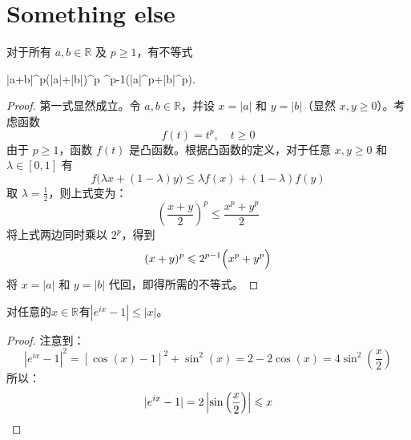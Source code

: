 \section{Something else}

\begin{theorem}
	对于所有 $a,b\in\mathbb{R}$ 及 $p\ge 1$，有不等式
	\begin{inequality*}\label{ineq:else-1}
		|a+b|^p\leqslant\Bigl(|a|+|b|\Bigr)^p ^{p-1}\Bigl(|a|^p+|b|^p\Bigr).
	\end{inequality*}
\end{theorem}
\begin{proof}
	第一式显然成立。令 $a,b\in\mathbb{R}$，并设 $x=|a|$ 和 $y=|b|$（显然 $x,y\geqslant0$）。考虑函数
	\begin{equation*}
		f(t)=t^p,\quad t\ge 0
	\end{equation*}
	由于 $p\geqslant1$，函数 $f(t)$ 是凸函数。根据凸函数的定义，对于任意 $x,y\ge 0$ 和 $\lambda\in[0,1]$ 有
	\begin{equation*}
		f\bigl(\lambda x+(1-\lambda)y\bigr)\leqslant\lambda f(x)+(1-\lambda)f(y)
	\end{equation*}
	取 $\lambda=\frac{1}{2}$，则上式变为：
	\begin{equation*}
		\left(\frac{x+y}{2}\right)^p\leqslant\frac{x^p+y^p}{2}
	\end{equation*}
	将上式两边同时乘以 $2^p$，得到
	\begin{equation*}
		(x+y)^p\leqslant2^{p-1}\Bigl(x^p+y^p\Bigr)
	\end{equation*}
	将 $x=|a|$ 和 $y=|b|$ 代回，即得所需的不等式。
\end{proof}

\begin{theorem}\label{theo:ExpMinus1Bound}
	对任意的$x\in\mathbb{R}^{}$有$|e^{ix}-1|\leqslant|x|$。
\end{theorem}
\begin{proof}
	注意到：
	\begin{equation*}
		|e^{ix}-1|^2=[\cos(x)-1]^2+\sin^2(x)=2-2\cos(x)=4\sin^2\left(\frac{x}{2}\right)
	\end{equation*}
	所以：
	\begin{equation*}
		|e^{ix}-1|=2\left|\sin\left(\frac{x}{2}\right)\right|\leqslant x\qedhere
	\end{equation*}
\end{proof}

